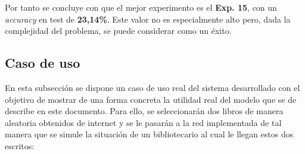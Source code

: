 \documentclass[12pt,a4paper, xcolor=table]{article}
\begin{document}
Por tanto se concluye con que el mejor experimento es el \textbf{Exp. 15}, con un \textit{accuracy} en test de \textbf{23,14\%}. Este valor no es especialmente alto pero, dada la complejidad del problema, se puede considerar como un éxito.

\newpage

\subsection{Caso de uso}
En esta subsección se dispone un caso de uso real del sistema desarrollado con el objetivo de mostrar de una forma concreta la utilidad real del modelo que se de describe en este documento. Para ello, se seleccionarán dos libros de manera aleatoria obtenidos de internet y se le pasarán a la red implementada de tal manera que se simule la situación de un bibliotecario al cual le llegan estos dos escritos:
\end{document}
